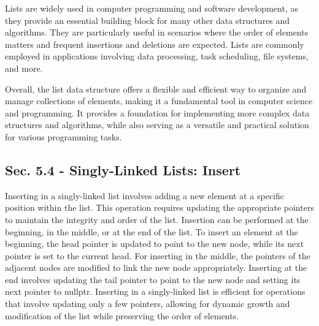 Lists are widely used in computer programming and software development, as they provide an essential building block for many other data structures and algorithms. They are particularly useful in scenarios where the order of elements matters and 
frequent insertions and deletions are expected. Lists are commonly employed in applications involving data processing, task scheduling, file systems, and more.

Overall, the list data structure offers a flexible and efficient way to organize and manage collections of elements, making it a fundamental tool in computer science and programming. It provides a foundation for implementing more complex data 
structures and algorithms, while also serving as a versatile and practical solution for various programming tasks.

\subsection*{Sec. 5.4 - Singly-Linked Lists: Insert}

Inserting in a singly-linked list involves adding a new element at a specific position within the list. This operation requires updating the appropriate pointers to maintain the integrity and order of the list. Insertion can be performed at the 
beginning, in the middle, or at the end of the list. To insert an element at the beginning, the head pointer is updated to point to the new node, while its next pointer is set to the current head. For inserting in the middle, the pointers of the 
adjacent nodes are modified to link the new node appropriately. Inserting at the end involves updating the tail pointer to point to the new node and setting its next pointer to nullptr. Inserting in a singly-linked list is efficient for operations 
that involve updating only a few pointers, allowing for dynamic growth and modification of the list while preserving the order of elements.

